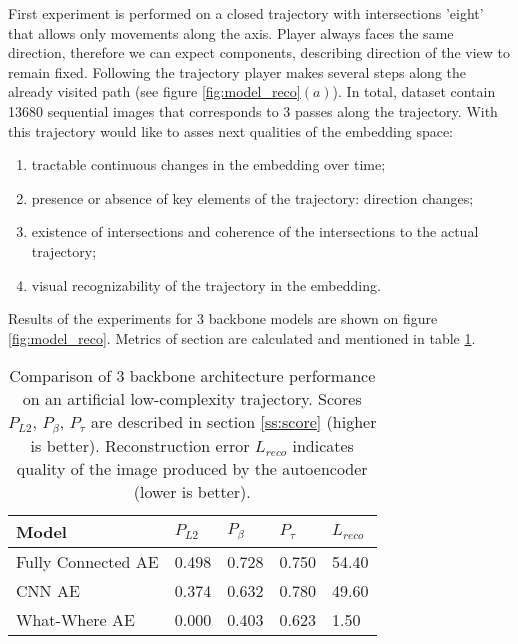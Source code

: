 First experiment is performed on a closed trajectory with intersections 'eight' that allows only movements along the axis. Player always faces the same direction, therefore we can expect components, describing direction of the view to remain fixed. Following the trajectory player makes several steps along the already visited path (see figure \ref{fig:model_reco}$(a)$). In total, dataset contain 13680 sequential images that corresponds to 3 passes along the trajectory. With this trajectory would like to asses next qualities of the embedding space:
\begin{enumerate}
  \item tractable continuous changes in the embedding over time;
  \item presence or absence of key elements of the trajectory: direction changes;
  \item existence of intersections and coherence of the intersections to the actual trajectory;
  \item visual recognizability of the trajectory in the embedding.
\end{enumerate}

Results of the experiments for 3 backbone models are shown on figure \ref{fig:model_reco}. Metrics of section \label{fig:model_reco} are calculated and mentioned in table \ref{tab:3demb}.


\begin{table}
\begin{center}
    \begin{tabular}{| l | l | l | l | l |}
    \hline
    Model  &  $P_{L2}$    &  $P_{\beta}$     &  $P_{\tau}$ &  $L_{reco}$ \\ \hline
    Fully Connected	 AE  & 0.498 & 0.728 & 0.750 & 54.40        \\
    CNN AE 	 & 0.374 & 0.632 & 0.780 & 49.60        \\
    What-Where AE 	   & 0.000 & 0.403 & 0.623 & 1.50         \\ \hline
    \end{tabular}
\end{center}
  \caption{Comparison of 3 backbone architecture performance on an artificial low-complexity trajectory. Scores   $P_{L2}$, $P_{\beta}$, $P_{\tau}$ are described in section \ref{ss:score} (higher is better). Reconstruction error $L_{reco}$ indicates quality of the image produced by the autoencoder (lower is better).}
  \label{tab:3demb}
\end{table}

